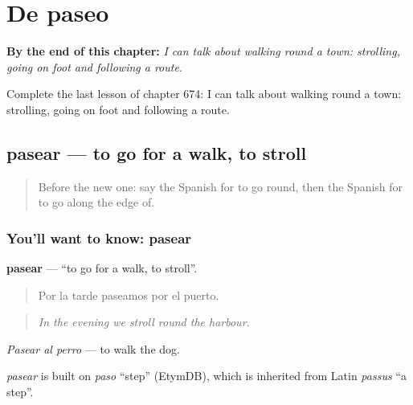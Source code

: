 
\chapter{De paseo}
\label{ch:es-de-paseo}

\begin{chapteropening}
\textbf{By the end of this chapter:} \emph{I can talk about walking round a town: strolling, going on foot and following a route.}

Complete the last lesson of chapter 674: I can talk about walking round a town: strolling, going on foot and following a route.
\end{chapteropening}

\section[pasear]{pasear — to go for a walk, to stroll}

\label{lesson:ES-C674-pasear}



\begin{quote}
Before the new one: say the Spanish for to go round, then the Spanish for to go along the edge of.
\end{quote}

\subsection*{You'll want to know: pasear}
\textbf{pasear} — \textquotedblleft{}to go for a walk, to stroll\textquotedblright{}.

\begin{quote}
Por la tarde paseamos por el puerto.
\end{quote}

\begin{quote}
\emph{In the evening we stroll round the harbour.}
\end{quote}

\emph{Pasear al perro} — to walk the dog.

\begin{cousinweb}
\emph{pasear} is built on \emph{paso} \textquotedblleft{}step\textquotedblright{} (EtymDB), which is inherited from Latin \emph{passus} \textquotedblleft{}a step\textquotedblright{}.
\end{cousinweb}

